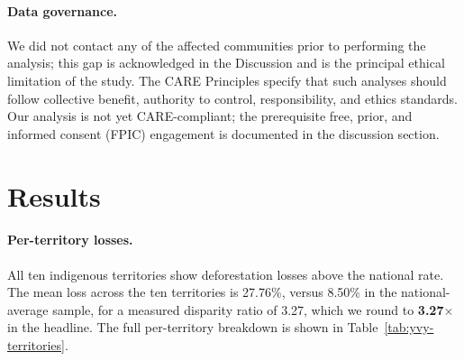 \paragraph{Data governance.} We did not contact any of the affected
communities prior to performing the analysis; this gap is acknowledged
in the Discussion and is the principal ethical limitation of the
study. The CARE Principles \citep{carroll2020care} specify that such
analyses should follow collective benefit, authority to control,
responsibility, and ethics standards. Our analysis is not yet
CARE-compliant; the prerequisite free, prior, and informed consent
(FPIC) engagement is documented in the discussion section.

\section{Results}
\label{sec:yvy-results}

\paragraph{Per-territory losses.} All ten indigenous territories show
deforestation losses above the national rate. The mean loss across the
ten territories is 27.76\%, versus 8.50\% in the national-average
sample, for a measured disparity ratio of 3.27, which we round to
\textbf{3.27}$\times$ in the headline. The full per-territory breakdown
is shown in Table~\ref{tab:yvy-territories}.

